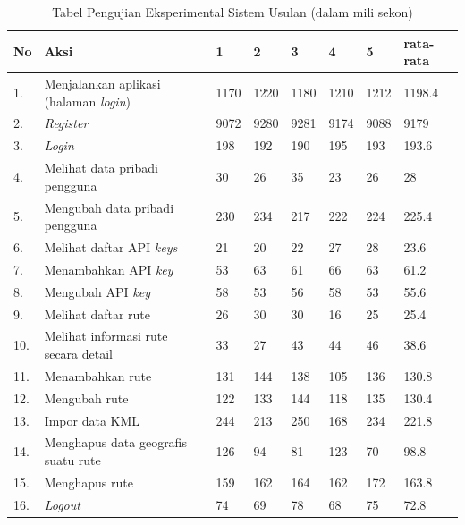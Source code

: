 \begin{table}[H]
	\centering
	\caption{Tabel Pengujian Eksperimental Sistem Usulan (dalam mili sekon)}
		\begin{tabular}{|p{0.37cm}| p{7cm}| p{1cm}| p{1cm}| p{1cm}| p{1cm}| p{1cm}| p{1cm}|} \hline
		No & Aksi & 1 & 2 & 3 & 4 & 5 & rata-rata \\ \hline
		1. & Menjalankan aplikasi (halaman \textit{login}) & 1170	&	1220	&	1180	&	1210	&	1212	&	1198.4 \\ \hline
 		2. & \textit{Register} & 9072	&	9280	&	9281	&	9174	&	9088	&	9179 \\ \hline
		3. & \textit{Login} & 198	&	192	&	190	&	195	&	193	&	193.6 \\ \hline
		4. & Melihat data pribadi pengguna & 30	&	26	&	35	&	23	&	26	&	28 \\ \hline
		5. & Mengubah data pribadi pengguna & 230	&	234	&	217	&	222	&	224	&	225.4 \\ \hline
		6. & Melihat daftar API \textit{keys} & 21	&	20	&	22	&	27	&	28	&	23.6 \\ \hline
		7. & Menambahkan API \textit{key} & 53	&	63	&	61	&	66	&	63	&	61.2 \\ \hline
		8. & Mengubah API \textit{key} & 58	&	53	&	56	&	58	&	53	&	55.6 \\ \hline
		9. & Melihat daftar rute & 26	&	30	&	30	&	16	&	25	&	25.4 \\ \hline
		10. & Melihat informasi rute secara detail & 33	&	27	&	43	&	44	&	46	&	38.6 \\ \hline
		11. & Menambahkan rute & 131	&	144	&	138	&	105	&	136	&	130.8 \\ \hline
		12. & Mengubah rute & 122	&	133	&	144	&	118	&	135	&	130.4 \\ \hline
		13. & Impor data KML & 244	&	213	&	250	&	168	&	234	&	221.8 \\ \hline
		14. & Menghapus data geografis suatu rute & 126	&	94	&	81	&	123	&	70	&	98.8 \\ \hline
		15. & Menghapus rute & 159	&	162	&	164	&	162	&	172	&	163.8 \\ \hline
		16. & \textit{Logout} & 74	&	69	&	78	&	68	&	75	&	72.8 \\ \hline
		\end{tabular}
	\label{table:hasileksperimental2}
\end{table}

